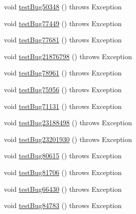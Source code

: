 \begin{DoxyCompactItemize}
\item 
void \mbox{\hyperlink{classtestsuite_1_1regression_1_1_statement_regression_test_a2b6b5d2943bee507e1d7495e883ae9c5}{test\+Bug50348}} ()  throws Exception 
\item 
void \mbox{\hyperlink{classtestsuite_1_1regression_1_1_statement_regression_test_a07a77723b5e6ea623ee8d6c78d7786af}{test\+Bug77449}} ()  throws Exception 
\item 
void \mbox{\hyperlink{classtestsuite_1_1regression_1_1_statement_regression_test_adc52d5ddc30d4e6b82fb24fd1c544d26}{test\+Bug77681}} ()  throws Exception 
\item 
void \mbox{\hyperlink{classtestsuite_1_1regression_1_1_statement_regression_test_a7c2127e901386b163bff95c5a884f307}{test\+Bug21876798}} ()  throws Exception 
\item 
void \mbox{\hyperlink{classtestsuite_1_1regression_1_1_statement_regression_test_a0813e2cf77078b1f8476ef827c5c9046}{test\+Bug78961}} ()  throws Exception 
\item 
void \mbox{\hyperlink{classtestsuite_1_1regression_1_1_statement_regression_test_ac552681461db44411308a9164a16e391}{test\+Bug75956}} ()  throws Exception 
\item 
void \mbox{\hyperlink{classtestsuite_1_1regression_1_1_statement_regression_test_a1e38b360b51a8f9704cef9040eb6a44d}{test\+Bug71131}} ()  throws Exception 
\item 
void \mbox{\hyperlink{classtestsuite_1_1regression_1_1_statement_regression_test_ad2c60d7105fb694d073cddbd8e1cdd48}{test\+Bug23188498}} ()  throws Exception 
\item 
void \mbox{\hyperlink{classtestsuite_1_1regression_1_1_statement_regression_test_a3d0ac2b92441d18279f454eff53dff23}{test\+Bug23201930}} ()  throws Exception 
\item 
void \mbox{\hyperlink{classtestsuite_1_1regression_1_1_statement_regression_test_a338c926f02a641b1cabb27021e7e06e4}{test\+Bug80615}} ()  throws Exception 
\item 
void \mbox{\hyperlink{classtestsuite_1_1regression_1_1_statement_regression_test_aa0b8a4caabb1d1ebc0338bcffacce81d}{test\+Bug81706}} ()  throws Exception 
\item 
void \mbox{\hyperlink{classtestsuite_1_1regression_1_1_statement_regression_test_ae6be3545c08d7afbbad86397d2ef9fb0}{test\+Bug66430}} ()  throws Exception 
\item 
void \mbox{\hyperlink{classtestsuite_1_1regression_1_1_statement_regression_test_a6a4bd5b7999d75792d30bdeb1b17b5af}{test\+Bug84783}} ()  throws Exception 

\end{DoxyCompactItemize}
